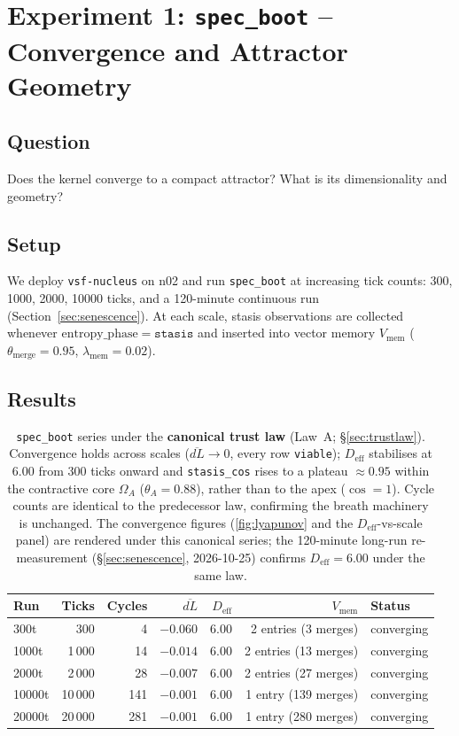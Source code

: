 \documentclass[11pt, a4paper]{article}
\newcommand{\nucleus}{\texttt{vsf-nucleus}}
\begin{document}
\section{Experiment 1: \texttt{spec\_boot} -- Convergence and Attractor Geometry}
\label{sec:specboot}

\subsection*{Question} Does the kernel converge to a compact attractor?
What is its dimensionality and geometry?

\subsection{Setup}

We deploy \nucleus{} on n02 and run \texttt{spec\_boot} at increasing tick
counts: 300, 1000, 2000, 10000 ticks, and a 120-minute continuous run
(Section~\ref{sec:senescence}).
At each scale, stasis observations are collected whenever
$\mathrm{entropy\_phase} = \texttt{stasis}$ and inserted into vector memory
$V_\text{mem}$ ($\theta_\text{merge} = 0.95$, $\lambda_\text{mem} = 0.02$).

\subsection{Results}

\begin{table}[!htb]
\centering
\begin{tabular}{lrrrrrl}
\toprule
Run & Ticks & Cycles & $\overline{dL}$ & $D_\text{eff}$ & $V_\text{mem}$ & Status \\
\midrule
300t   &    300 &   4 & $-0.060$ & 6.00 & 2 entries (3 merges)  & converging \\
1000t  &  1\,000 &  14 & $-0.014$ & 6.00 & 2 entries (13 merges) & converging \\
2000t  &  2\,000 &  28 & $-0.007$ & 6.00 & 2 entries (27 merges) & converging \\
10000t & 10\,000 & 141 & $-0.001$ & 6.00 & 1 entry (139 merges)  & converging \\
20000t & 20\,000 & 281 & $-0.001$ & 6.00 & 1 entry (280 merges)  & converging \\
\bottomrule
\end{tabular}
\caption{\texttt{spec\_boot} series under the \textbf{canonical trust law}
(Law~A; \S\ref{sec:trustlaw}). Convergence holds across scales
($\overline{dL}\to 0$, every row \texttt{viable}); $D_\text{eff}$ stabilises at
$6.00$ from 300 ticks onward and \texttt{stasis\_cos} rises to a plateau
$\approx 0.95$ within the contractive core $\Omega_A$ ($\theta_A = 0.88$), rather
than to the apex ($\cos = 1$). Cycle counts are identical to the predecessor law,
confirming the breath machinery is unchanged. The convergence figures
(\ref{fig:lyapunov} and the $D_\text{eff}$-vs-scale panel) are rendered under
this canonical series; the 120-minute long-run re-measurement
(\S\ref{sec:senescence}, 2026-10-25) confirms $D_\text{eff}=6.00$ under the
same law.}
\label{tab:specboot}
\end{table}
\end{document}
